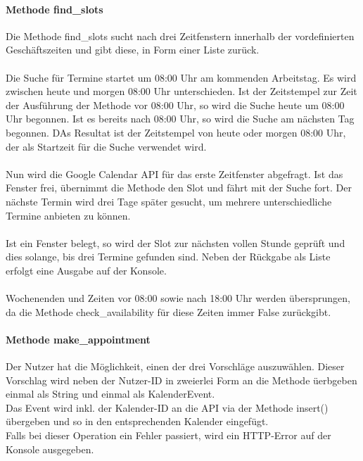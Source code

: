             \paragraph{Methode find\_slots}
                Die Methode find\_slots sucht nach drei Zeitfenstern innerhalb der vordefinierten Geschäftszeiten und gibt diese, in Form einer Liste zurück. \\
                \\
                Die Suche für Termine startet um 08:00 Uhr am kommenden Arbeitstag. Es wird zwischen heute und morgen 08:00 Uhr unterschieden. Ist der Zeitstempel zur Zeit der Ausführung der Methode vor 08:00 Uhr, so wird die Suche heute um 08:00 Uhr begonnen. Ist es bereits nach 08:00 Uhr, so wird die Suche am nächsten Tag begonnen. DAs Resultat ist der Zeitstempel von heute oder morgen 08:00 Uhr, der als Startzeit für die Suche verwendet wird. \\
                \\
                Nun wird die Google Calendar API für das erste Zeitfenster abgefragt. Ist das Fenster frei, übernimmt die Methode den Slot und fährt mit der Suche fort. Der nächste Termin wird drei Tage später gesucht, um mehrere unterschiedliche Termine anbieten zu können. \\
                \\
                Ist ein Fenster belegt, so wird der Slot zur nächsten vollen Stunde geprüft und dies solange, bis drei Termine gefunden sind. Neben der Rückgabe als Liste erfolgt eine Ausgabe auf der Konsole.\\
                \\
                Wochenenden und Zeiten vor 08:00 sowie nach 18:00 Uhr werden übersprungen, da die Methode check\_availability für diese Zeiten immer False zurückgibt.


            \paragraph{Methode make\_appointment}
                Der Nutzer hat die Möglichkeit, einen der drei Vorschläge auszuwählen. Dieser Vorschlag wird neben der Nutzer-ID in zweierlei Form an die Methode üerbgeben \- einmal als String und einmal als Kalender\-Event. \\
                Das Event wird inkl. der Kalender-ID an die API via der Methode insert() übergeben und so in den entsprechenden Kalender eingefügt. \\
                Falls bei dieser Operation ein Fehler passiert, wird ein HTTP-Error auf der Konsole ausgegeben.


